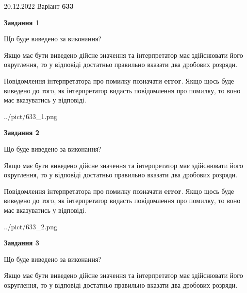 \documentclass[12pt, ukrainian]{article}
\begin{document}
{20.12.2022 Варіант \No \textbf { 633 }\par}
{
\begin {Large}

{\begin {center}\textbf{Завдання 1}\end {center}}\par
Що буде виведено за виконання? \par

Якщо має бути виведено дійсне значення та інтерпретатор має здійснювати його округлення, 
то у відповіді достатньо правильно вказати два дробових розряди.

Повідомлення інтерпретатора про помилку позначати \textbf{error}.
Якщо щось буде виведено до того, як інтерпретатор видасть повідомлення про помилку, 
то воно має вказуватись у відповіді. \par

\begin{center}
	{../pict/633_1.png}
\end{center}
\newpage

{\begin {center}\textbf{Завдання 2}\end {center}}\par
Що буде виведено за виконання? \par

Якщо має бути виведено дійсне значення та інтерпретатор має здійснювати його округлення, 
то у відповіді достатньо правильно вказати два дробових розряди.

Повідомлення інтерпретатора про помилку позначати \textbf{error}.
Якщо щось буде виведено до того, як інтерпретатор видасть повідомлення про помилку, 
то воно має вказуватись у відповіді. \par

\begin{center}
	{../pict/633_2.png}
\end{center}
\newpage

{\begin {center}\textbf{Завдання 3}\end {center}}\par
Що буде виведено за виконання? \par

Якщо має бути виведено дійсне значення та інтерпретатор має здійснювати його округлення, 
то у відповіді достатньо правильно вказати два дробових розряди.


\end{Large}}
\end{document}
